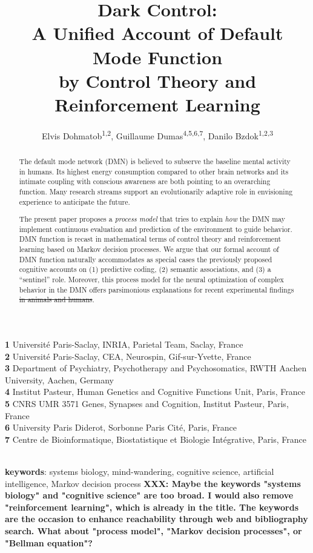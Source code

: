 \documentclass[10pt,letterpaper]{article}
\date{}
\title{Dark Control:\\
       A Unified Account of Default Mode Function\\
       by Control Theory and Reinforcement Learning}
\newcommand{\suggestremove}[1]{{\color{red} \sout{#1}}}
\begin{document}
\author{Elvis Dohmatob\textsuperscript{1,2}, Guillaume Dumas\textsuperscript{4,5,6,7}, Danilo Bzdok\textsuperscript{1,2,3}
}

\maketitle
\small{
    \textbf{1} Universit\'e Paris-Saclay, INRIA, Parietal Team, Saclay, France\\
    \textbf{2} Universit\'e Paris-Saclay, CEA, Neurospin, Gif-sur-Yvette, France\\
    \textbf{3} Department of Psychiatry, Psychotherapy and Psychosomatics, RWTH Aachen University, Aachen, Germany\\
    \textbf{4} Institut Pasteur, Human Genetics and Cognitive Functions Unit, Paris, France\\
    \textbf{5} CNRS UMR 3571 Genes, Synapses and Cognition, Institut Pasteur, Paris, France\\
    \textbf{6} University Paris Diderot, Sorbonne Paris Cit\'e, Paris, France\\
    \textbf{7} Centre de Bioinformatique, Biostatistique et Biologie Int\'egrative, Paris, France
}

\begin{abstract}
The default mode network (DMN) is believed to subserve the
baseline mental activity in humans.
%
Its highest energy consumption compared to other brain networks and
its intimate coupling with conscious awareness are both pointing to
an overarching function.
%
Many research streams support an evolutionarily adaptive role in
envisioning experience to anticipate the future.


The present paper proposes a \textit{process model}
that tries to explain \textit{how}
the DMN may implement
continuous evaluation and prediction of the environment to guide behavior.
%
DMN function is recast in mathematical terms of
control theory and reinforcement learning based on Markov decision processes.
%
We argue that our formal account of DMN function naturally accommodates as special cases
the previously proposed cognitive accounts on
(1) predictive coding,
(2) semantic associations, and
(3) a ``sentinel'' role.
%
Moreover, this process model for the neural optimization of complex behavior in the DMN
offers parsimonious explanations for
recent experimental findings\suggestremove{ in animals and humans}.
\end{abstract}

\textbf{\\keywords}: systems biology, mind-wandering, cognitive science,
artificial intelligence, Markov decision process
\textbf{XXX: Maybe the keywords "systems biology" and "cognitive science" are too broad. I would also remove "reinforcement learning", which is already in the title. The keywords are the occasion to enhance reachability through web and bibliography search. What about "process model", "Markov decision processes", or "Bellman equation"?}
\end{document}
